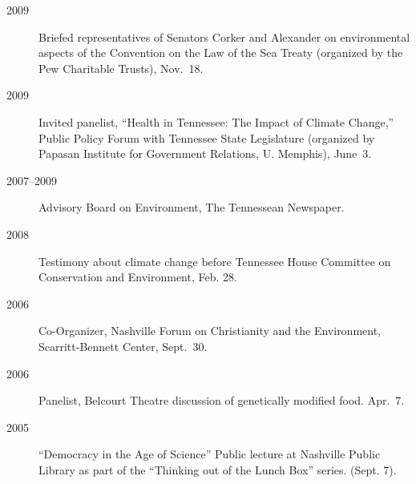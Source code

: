 \documentclass[10pt]{article}
\begin{document}
\begin{description}
        	\item[2009] Briefed representatives of Senators Corker and Alexander on environmental aspects of the Convention on the Law of the Sea Treaty (organized by the Pew Charitable Trusts), Nov.~18.
        	\item[2009] Invited panelist, ``Health in Tennessee: The Impact of Climate Change,'' Public Policy Forum with Tennessee State Legislature (organized by Papasan Institute for Government Relations, U. Memphis), June~3.
        	\item[2007--2009] Advisory Board on Environment, The Tennessean Newspaper.
        	\item[2008] Testimony about climate change before Tennessee House Committee on Conservation and Environment, Feb. 28.
        	\item[2006] Co-Organizer, Nashville Forum on Christianity and the Environment, Scarritt-Bennett Center, Sept.~30.
        	\item[2006] Panelist, Belcourt Theatre discussion of genetically modified food. Apr.~7.
            \item[2005] ``Democracy in the Age of Science'' Public lecture at Nashville Public Library as part of the ``Thinking out of the Lunch Box'' series. (Sept. 7).
        \end{description}
\end{document}
